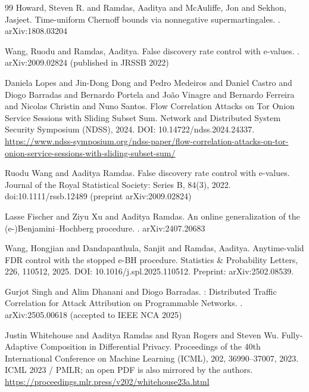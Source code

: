 \documentclass[11pt]{article}
\begin{document}
\begin{thebibliography}{99}
Howard, Steven R. and Ramdas, Aaditya and McAuliffe, Jon and Sekhon, Jasjeet.
\newblock Time-uniform Chernoff bounds via nonnegative supermartingales.
.
\newblock arXiv:1808.03204

Wang, Ruodu and Ramdas, Aaditya.
\newblock False discovery rate control with e-values.
.
\newblock arXiv:2009.02824 (published in JRSSB 2022)

Daniela Lopes and Jin-Dong Dong and Pedro Medeiros and Daniel Castro and Diogo Barradas and Bernardo Portela and Jo{\~a}o Vinagre and Bernardo Ferreira and Nicolas Christin and Nuno Santos.
\newblock Flow Correlation Attacks on {Tor} Onion Service Sessions with Sliding Subset Sum.
\newblock Network and Distributed System Security Symposium (NDSS), 2024.
\newblock DOI: 10.14722/ndss.2024.24337.
\newblock \url{https://www.ndss-symposium.org/ndss-paper/flow-correlation-attacks-on-tor-onion-service-sessions-with-sliding-subset-sum/}

Ruodu Wang and Aaditya Ramdas.
\newblock False discovery rate control with e-values.
\newblock Journal of the Royal Statistical Society: Series B, 84(3), 2022.
\newblock doi:10.1111/rssb.12489 (preprint arXiv:2009.02824)

Lasse Fischer and Ziyu Xu and Aaditya Ramdas.
\newblock An online generalization of the (e-)Benjamini--Hochberg procedure.
.
\newblock arXiv:2407.20683

Wang, Hongjian and Dandapanthula, Sanjit and Ramdas, Aaditya.
\newblock Anytime-valid {FDR} control with the stopped e-{BH} procedure.
\newblock Statistics \& Probability Letters, 226, 110512, 2025.
\newblock DOI: 10.1016/j.spl.2025.110512.
\newblock Preprint: arXiv:2502.08539.

Gurjot Singh and Alim Dhanani and Diogo Barradas.
: Distributed Traffic Correlation for Attack Attribution on Programmable Networks.
.
\newblock arXiv:2505.00618 (accepted to IEEE NCA 2025)

Justin Whitehouse and Aaditya Ramdas and Ryan Rogers and Steven Wu.
\newblock Fully-Adaptive Composition in Differential Privacy.
\newblock Proceedings of the 40th International Conference on Machine Learning (ICML), 202, 36990--37007, 2023.
\newblock ICML 2023 / PMLR; an open PDF is also mirrored by the authors.
\newblock \url{https://proceedings.mlr.press/v202/whitehouse23a.html}


\end{thebibliography}
\end{document}

